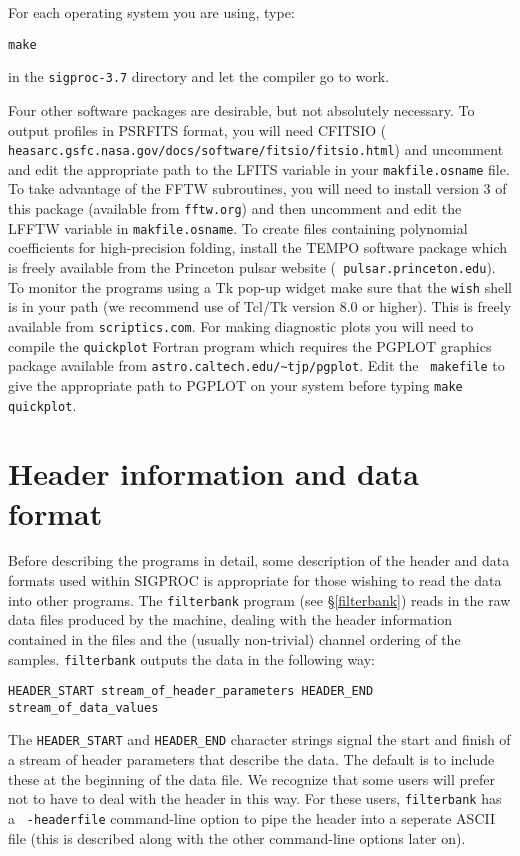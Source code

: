 \documentclass[11pt]{article}
\begin{document}
For each operating system you are using, type:

\noindent
{\tt make}

\noindent in the
{\tt sigproc-3.7} directory
and let the compiler go to work. 

Four other software packages are desirable, but not absolutely
necessary.  To output profiles in PSRFITS format, you will need
CFITSIO ({\tt 
heasarc.gsfc.nasa.gov/docs/software/fitsio/fitsio.html})
and uncomment and edit the appropriate path to the LFITS variable in your
{\tt makfile.osname} file. To take advantage of the FFTW subroutines,
you will need to install version 3 of this package (available from
{\tt fftw.org}) and then uncomment and edit the LFFTW variable in
{\tt makfile.osname}.
To create files containing polynomial coefficients for
high-precision folding, install the {\sc TEMPO} software package which
is freely available from the Princeton pulsar website ({\tt
pulsar.princeton.edu}).  To monitor the programs using a Tk
pop-up widget make sure that the {\tt wish} shell is in your path (we
recommend use of Tcl/Tk version 8.0 or higher). This is freely
available from {\tt scriptics.com}. For making diagnostic
plots you will need to compile the {\tt quickplot} Fortran program which
requires the {\sc PGPLOT} graphics package available from 
\verb+astro.caltech.edu/~tjp/pgplot+. Edit the {\tt
makefile} to give the appropriate path to {\sc PGPLOT} on your system
before typing {\tt make quickplot}.

\clearpage
\section{Header information and data format}
\label{dataformat}
Before describing the programs in detail, some description of the
header and data formats used within SIGPROC is appropriate for those
wishing to read the data into other programs.  The {\tt filterbank}
program (see \S \ref{filterbank}) reads in the raw data files produced
by the machine, dealing with the header information contained in the
files and the (usually non-trivial) channel ordering of the
samples. {\tt filterbank} outputs the data in the following way:
\begin{verbatim}
HEADER_START stream_of_header_parameters HEADER_END stream_of_data_values
\end{verbatim}
The \verb+HEADER_START+ and \verb+HEADER_END+ character strings
signal the start and
finish of a stream of header parameters that describe the data.  The
default is to include these at the beginning of the data file.  We
recognize that some users will prefer not to have to deal with the
header in this way. For these users, {\tt filterbank} has a {\tt
-headerfile} command-line option to pipe the header into a seperate
ASCII file (this is described along with the other command-line
options later on).
\end{document}
